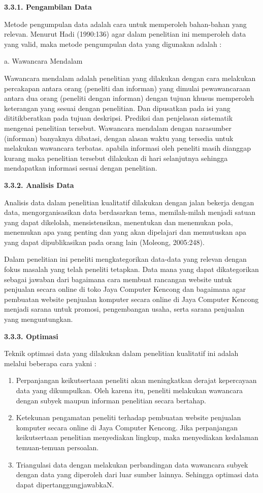 \documentclass[11pt]{article}
\begin{document}
\textbf{3.3.1. Pengambilan Data}

Metode pengumpulan data adalah cara untuk memperoleh bahan-bahan yang relevan. Menurut Hadi (1990:136) agar dalam penelitian ini memperoleh data yang valid, maka metode pengumpulan data yang digunakan adalah :

a. Wawancara Mendalam

Wawancara mendalam adalah penelitian yang dilakukan dengan cara melakukan percakapan antara orang (peneliti dan informan) yang dimulai pewawancaraan antara dua orang (peneliti dengan informan) dengan tujuan khusus memperoleh keterangan yang sesuai dengan penelitian. Dan dipusatkan pada isi yang dititikberatkan pada tujuan deskripsi. Prediksi dan penjelasan sistematik mengenai penelitian tersebut. Wawancara mendalam dengan narasumber (informan) banyaknya dibatasi, dengan alasan waktu yang tersedia untuk melakukan wawancara terbatas. apabila informasi oleh peneliti masih dianggap kurang maka penelitian tersebut dilakukan di hari selanjutnya sehingga mendapatkan informasi sesuai dengan penelitian.

\textbf{3.3.2. Analisis Data}

Analisis data dalam penelitian kualitatif dilakukan dengan jalan bekerja dengan data, mengorganisasikan data berdasarkan tema, memilah-milah menjadi satuan yang dapat dikelolah, mensistensikan, menentukan dan menemukan pola, menemukan apa yang penting dan yang akan dipelajari dan memutuskan apa yang dapat dipublikasikan pada orang lain (Moleong, 2005:248).

Dalam penelitian ini peneliti mengkategorikan data-data yang relevan dengan fokus masalah yang telah peneliti tetapkan. Data mana yang dapat dikategorikan sebagai jawaban dari bagaimana cara membuat rancangan website untuk penjualan secara online di toko Jaya Computer Kencong dan bagaimana agar pembuatan website penjualan komputer secara online di Jaya Computer Kencong menjadi sarana untuk promosi, pengembangan usaha, serta sarana penjualan yang menguntungkan.

\textbf{3.3.3. Optimasi}

Teknik optimasi data yang dilakukan dalam penelitian kualitatif ini adalah melalui beberapa cara yakni :

\begin{enumerate}
	\item Perpanjangan keikutsertaan peneliti akan meningkatkan derajat kepercayaan data yang dikumpulkan. Oleh karena itu, peneliti melakukan wawancara dengan subyek maupun informan penelitian secara bertahap.
	\item Ketekunan pengamatan peneliti terhadap pembuatan website penjualan komputer secara online di Jaya Computer Kencong. Jika perpanjangan keikutsertaan penelitian menyediakan lingkup, maka menyediakan kedalaman temuan-temuan persoalan.
	\item Triangulasi data dengan melakukan perbandingan data wawancara subyek dengan data yang diperoleh dari luar sumber lainnya. Sehingga optimasi data dapat dipertanggungjawabkaN.
\end{enumerate}
\end{document}
